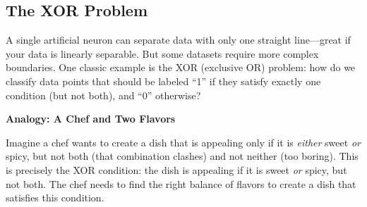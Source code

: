 \documentclass[9pt]{extarticle}
\theoremstyle{plain}
\theoremstyle{definition}
\theoremstyle{remark}
\begin{document}
\subsection{The XOR Problem}
A single artificial neuron can separate data with only one straight line—great if your data is linearly separable. But some datasets require more complex boundaries. One classic example is the XOR (exclusive OR) problem: how do we classify data points that should be labeled “1” if they satisfy exactly one condition (but not both), and “0” otherwise?

\vspace{1em} \noindent \textbf{Analogy: A Chef and Two Flavors}

\noindent Imagine a chef wants to create a dish that is appealing only if it is \textit{either} sweet \textit{or} spicy, but not both (that combination clashes) and not neither (too boring). This is precisely the XOR condition: the dish is appealing if it is sweet \textit{or} spicy, but not both. The chef needs to find the right balance of flavors to create a dish that satisfies this condition.
\end{document}
